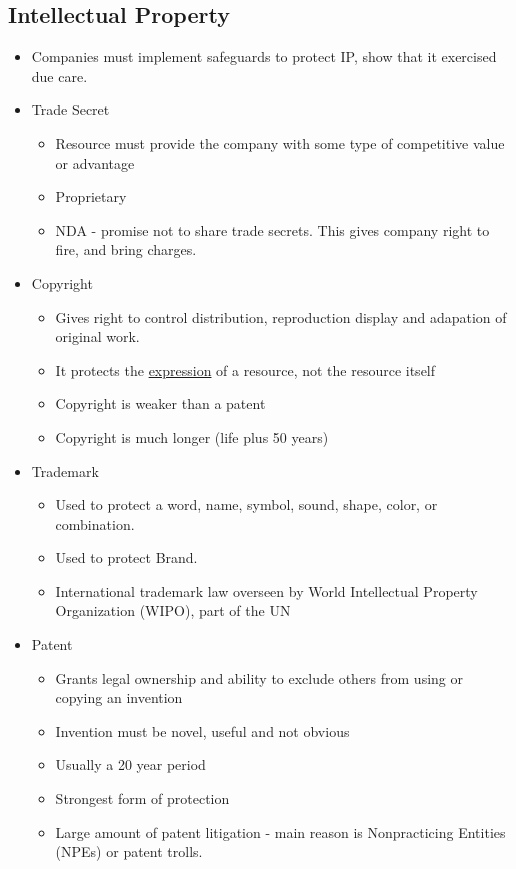 \documentclass[11pt]{article}
\begin{document}
\subsection{Intellectual Property}
\label{sec:orgf7715bc}
\begin{itemize}
\item Companies must implement safeguards to protect IP, show that it exercised due care.
\item Trade Secret
\begin{itemize}
\item Resource must provide the company with some type of competitive value or advantage
\item Proprietary
\item NDA - promise not to share trade secrets. This gives company right to fire, and bring charges.
\end{itemize}
\item Copyright
\begin{itemize}
\item Gives right to control distribution, reproduction display and adapation of original work.
\item It protects the \uline{expression} of a resource, not the resource itself
\item Copyright is weaker than a patent
\item Copyright is much longer (life plus 50 years)
\end{itemize}
\item Trademark
\begin{itemize}
\item Used to protect a word, name, symbol, sound, shape, color, or combination.
\item Used to protect Brand.
\item International trademark law overseen by World Intellectual Property Organization (WIPO), part of the UN
\end{itemize}
\item Patent
\begin{itemize}
\item Grants legal ownership and ability to exclude others from using or copying an invention
\item Invention must be novel, useful and not obvious
\item Usually a 20 year period
\item Strongest form of protection
\item Large amount of patent litigation - main reason is Nonpracticing Entities (NPEs) or patent trolls.
\end{itemize}
\end{itemize}
\end{document}
